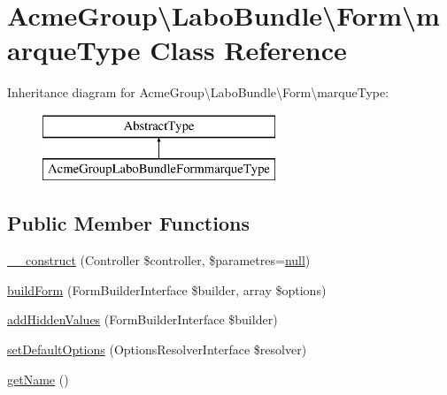 \hypertarget{class_acme_group_1_1_labo_bundle_1_1_form_1_1marque_type}{\section{Acme\+Group\textbackslash{}Labo\+Bundle\textbackslash{}Form\textbackslash{}marque\+Type Class Reference}
\label{class_acme_group_1_1_labo_bundle_1_1_form_1_1marque_type}
}
Inheritance diagram for Acme\+Group\textbackslash{}Labo\+Bundle\textbackslash{}Form\textbackslash{}marque\+Type\+:\begin{figure}[H]
\begin{center}
\leavevmode
\includegraphics[height=2.000000cm]{class_acme_group_1_1_labo_bundle_1_1_form_1_1marque_type}
\end{center}
\end{figure}
\subsection*{Public Member Functions}
\begin{DoxyCompactItemize}
\item 
\hyperlink{class_acme_group_1_1_labo_bundle_1_1_form_1_1marque_type_a80ffbdb3d750546aca460149ce54a1d0}{\+\_\+\+\_\+construct} (Controller \$controller, \$parametres=\hyperlink{validate_8js_afb8e110345c45e74478894341ab6b28e}{null})
\item 
\hyperlink{class_acme_group_1_1_labo_bundle_1_1_form_1_1marque_type_a15c46893968425608e2188c191aab7fb}{build\+Form} (Form\+Builder\+Interface \$builder, array \$options)
\item 
\hyperlink{class_acme_group_1_1_labo_bundle_1_1_form_1_1marque_type_a3c88d125fcea434726e5b383ee3889fb}{add\+Hidden\+Values} (Form\+Builder\+Interface \$builder)
\item 
\hyperlink{class_acme_group_1_1_labo_bundle_1_1_form_1_1marque_type_a845f785328804f3599a511ce19ee371c}{set\+Default\+Options} (Options\+Resolver\+Interface \$resolver)
\item 
\hyperlink{class_acme_group_1_1_labo_bundle_1_1_form_1_1marque_type_ad8c51d96a6ffd17e4780f1ba7d1d2466}{get\+Name} ()
\end{DoxyCompactItemize}


